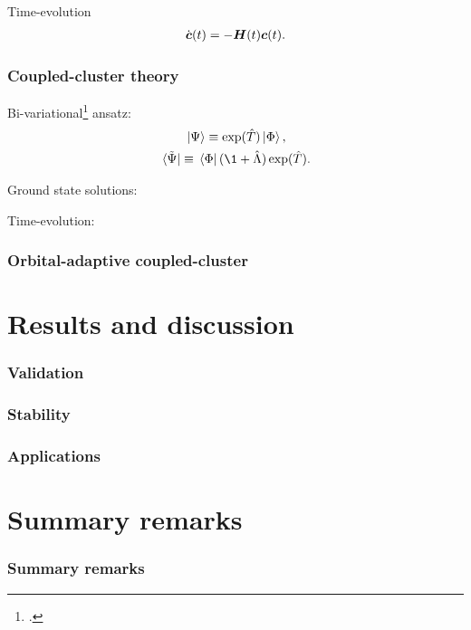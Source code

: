 \documentclass{beamer}
\begin{document}
\begin{frame}
    Time-evolution
    \begin{align}
        \dot{\boldsymbol{c}}(t) = -\boldsymbol{H}(t)\boldsymbol{c}(t).
    \end{align}
\end{frame}

\begin{frame}
    \frametitle{Coupled-cluster theory}
    Bi-variational\footcite{arponen1983311} ansatz:
    \begin{gather}
        \ket*{\Psi} \equiv \exponential(\clust)\ket*{\slat},
        \\
        \bra*{\tilde{\Psi}} \equiv
        \bra*{\slat}(\1 + \clustl)\exponential(\clust).
    \end{gather}
\end{frame}

\begin{frame}
    Ground state solutions:
\end{frame}

\begin{frame}
    Time-evolution:
\end{frame}

\begin{frame}
    \frametitle{Orbital-adaptive coupled-cluster}
\end{frame}

\section{Results and discussion}

\begin{frame}
    \frametitle{Validation}
\end{frame}

\begin{frame}
    \frametitle{Stability}
\end{frame}

\begin{frame}
    \frametitle{Applications}
\end{frame}

\section{Summary remarks}

\begin{frame}
    \frametitle{Summary remarks}
\end{frame}
\end{document}
